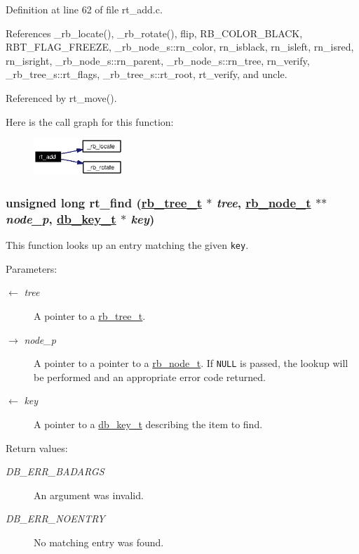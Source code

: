 Definition at line 62 of file rt\_\-add.c.

References \_\-rb\_\-locate(), \_\-rb\_\-rotate(), flip, RB\_\-COLOR\_\-BLACK, RBT\_\-FLAG\_\-FREEZE, \_\-rb\_\-node\_\-s::rn\_\-color, rn\_\-isblack, rn\_\-isleft, rn\_\-isred, rn\_\-isright, \_\-rb\_\-node\_\-s::rn\_\-parent, \_\-rb\_\-node\_\-s::rn\_\-tree, rn\_\-verify, \_\-rb\_\-tree\_\-s::rt\_\-flags, \_\-rb\_\-tree\_\-s::rt\_\-root, rt\_\-verify, and uncle.

Referenced by rt\_\-move().

Here is the call graph for this function:\begin{figure}[H]
\begin{center}
\leavevmode
\includegraphics[width=95pt]{group__dbprim__rbtree_ga7_cgraph}
\end{center}
\end{figure}
\hypertarget{group__dbprim__rbtree_ga10}{
\subsubsection[rt\_\-find]{\setlength{\rightskip}{0pt plus 5cm}unsigned long rt\_\-find (\hyperlink{struct__rb__tree__s}{rb\_\-tree\_\-t} $\ast$ {\em tree}, \hyperlink{struct__rb__node__s}{rb\_\-node\_\-t} $\ast$$\ast$ {\em node\_\-p}, \hyperlink{struct__db__key__s}{db\_\-key\_\-t} $\ast$ {\em key})}}
\label{group__dbprim__rbtree_ga10}


This function looks up an entry matching the given {\tt key}.

\begin{Desc}
\item[Parameters:]
\begin{description}
\item[\mbox{$\leftarrow$} {\em tree}]A pointer to a \hyperlink{group__dbprim__rbtree_ga0}{rb\_\-tree\_\-t}. \item[\mbox{$\rightarrow$} {\em node\_\-p}]A pointer to a pointer to a \hyperlink{group__dbprim__rbtree_ga1}{rb\_\-node\_\-t}. If {\tt NULL} is passed, the lookup will be performed and an appropriate error code returned. \item[\mbox{$\leftarrow$} {\em key}]A pointer to a \hyperlink{group__dbprim_ga0}{db\_\-key\_\-t} describing the item to find.\end{description}
\end{Desc}
\begin{Desc}
\item[Return values:]
\begin{description}
\item[{\em DB\_\-ERR\_\-BADARGS}]An argument was invalid. \item[{\em DB\_\-ERR\_\-NOENTRY}]No matching entry was found.\end{description}
\end{Desc}


